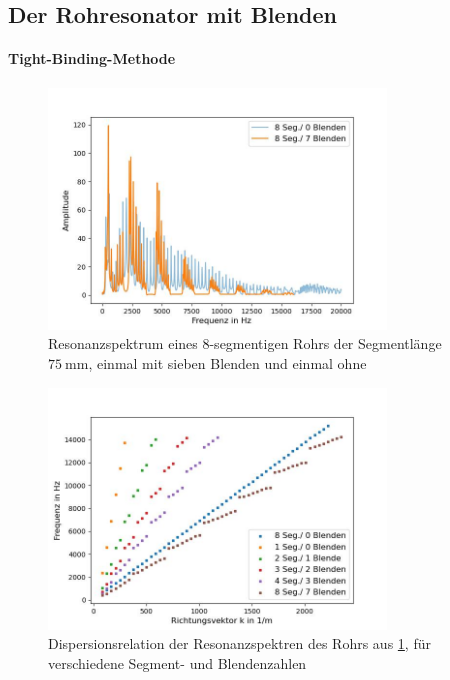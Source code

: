 \documentclass[../main.tex]{subfiles}
\begin{document}
\subsection{Der Rohresonator mit Blenden}
    \paragraph{Tight-Binding-Methode}
        \begin{figure}[H]
            \centering
            \includegraphics[width=0.8\textwidth]{Bilddateien/Auswertung/V_i_Resonanzspektrum_Lang.jpg}
            \caption{Resonanzspektrum eines 8-segmentigen Rohrs der Segmentlänge $\SI{75}{\milli\metre}$, einmal mit sieben Blenden und einmal ohne}
            \label{fig:V_i_Resonanzspektrum_Lang}
        \end{figure}

        \begin{figure}[H]
            \centering
            \includegraphics[width=0.8\textwidth]{Bilddateien/Auswertung/V_j_Dispersionsrelation_Lang.jpg}
            \caption{Dispersionsrelation der Resonanzspektren des Rohrs aus \ref{fig:V_i_Resonanzspektrum_Lang}, für verschiedene Segment- und Blendenzahlen}
            \label{fig:V_j_Dispersionsrelation_Lang}
        \end{figure}
\end{document}
